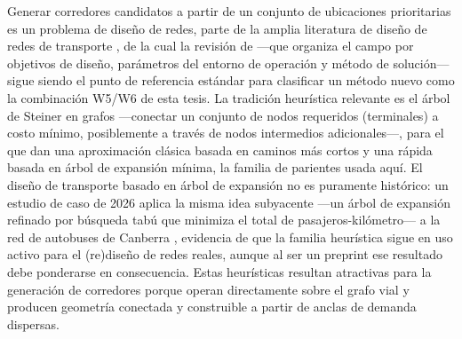 Generar corredores candidatos a partir de un conjunto de ubicaciones prioritarias es un
problema de diseño de redes, parte de la amplia literatura de diseño de redes de transporte
\parencite{guihaire2008, farahani2013review}, de la cual la revisión de
\textcite{kepaptsoglou2009review} ---que organiza el campo por objetivos de diseño,
parámetros del entorno de operación y método de solución--- sigue siendo el punto de
referencia estándar para clasificar un método nuevo como la combinación W5/W6 de esta
tesis. La tradición heurística relevante es el árbol
de Steiner en grafos ---conectar un conjunto de nodos requeridos (terminales) a costo
mínimo, posiblemente a través de nodos intermedios adicionales---, para el que
\textcite{takahashi1980} dan una aproximación clásica basada en caminos más cortos y
\textcite{kmb1981steiner} una rápida basada en árbol de expansión mínima, la familia de
parientes usada aquí. El diseño de transporte basado en árbol de expansión no es
puramente histórico: un estudio de caso de 2026 aplica la misma idea subyacente ---un
árbol de expansión refinado por búsqueda tabú que minimiza el total de
pasajeros-kilómetro--- a la red de autobuses de Canberra \parencite{suguira2026spanningtree},
evidencia de que la familia heurística sigue en uso activo para el (re)diseño de redes
reales, aunque al ser un preprint ese resultado debe ponderarse en consecuencia. Estas
heurísticas resultan atractivas para la generación de corredores
porque operan directamente sobre el grafo vial y producen geometría conectada y construible
a partir de anclas de demanda dispersas.

